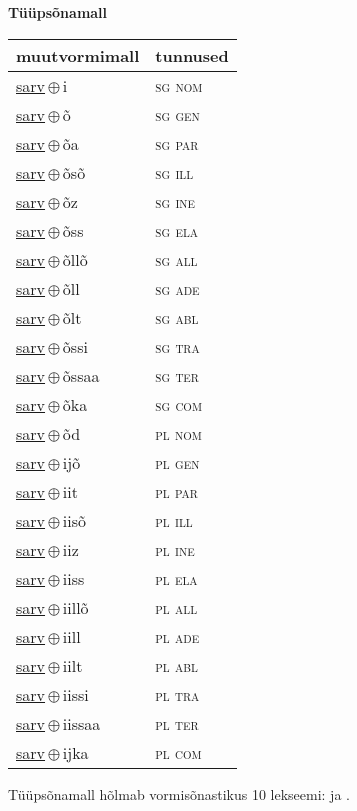 

\vspace{3.5em}
\noindent \begin{minipage}{\textwidth}
\noindent \textbf{Tüüpsõnamall \,}\\

\begin{sideways}
\begin{tabular}{l l}
muutvormimall & tunnused \\
\hline
\underline{sarv}\,$\oplus$\,i & \textsc{ sg nom } \\
\underline{sarv}\,$\oplus$\,õ & \textsc{ sg gen } \\
\underline{sarv}\,$\oplus$\,õa & \textsc{ sg par } \\
\underline{sarv}\,$\oplus$\,õsõ & \textsc{ sg ill } \\
\underline{sarv}\,$\oplus$\,õz & \textsc{ sg ine } \\
\underline{sarv}\,$\oplus$\,õss & \textsc{ sg ela } \\
\underline{sarv}\,$\oplus$\,õllõ & \textsc{ sg all } \\
\underline{sarv}\,$\oplus$\,õll & \textsc{ sg ade } \\
\underline{sarv}\,$\oplus$\,õlt & \textsc{ sg abl } \\
\underline{sarv}\,$\oplus$\,õssi & \textsc{ sg tra } \\
\underline{sarv}\,$\oplus$\,õssaa & \textsc{ sg ter } \\
\underline{sarv}\,$\oplus$\,õka & \textsc{ sg com } \\
\underline{sarv}\,$\oplus$\,õd & \textsc{ pl nom } \\
\underline{sarv}\,$\oplus$\,ijõ & \textsc{ pl gen } \\
\underline{sarv}\,$\oplus$\,iit & \textsc{ pl par } \\
\underline{sarv}\,$\oplus$\,iisõ & \textsc{ pl ill } \\
\underline{sarv}\,$\oplus$\,iiz & \textsc{ pl ine } \\
\underline{sarv}\,$\oplus$\,iiss & \textsc{ pl ela } \\
\underline{sarv}\,$\oplus$\,iillõ & \textsc{ pl all } \\
\underline{sarv}\,$\oplus$\,iill & \textsc{ pl ade } \\
\underline{sarv}\,$\oplus$\,iilt & \textsc{ pl abl } \\
\underline{sarv}\,$\oplus$\,iissi & \textsc{ pl tra } \\
\underline{sarv}\,$\oplus$\,iissaa & \textsc{ pl ter } \\
\underline{sarv}\,$\oplus$\,ijka & \textsc{ pl com } \\
\end{tabular}
\end{sideways}
\label{tab:tüüpsõnamall-sarvi}

\end{minipage}

 
\vspace{1em}
\noindent Tüüpsõnamall  hõlmab vormisõnastikus 10 lekseemi:  ja .
